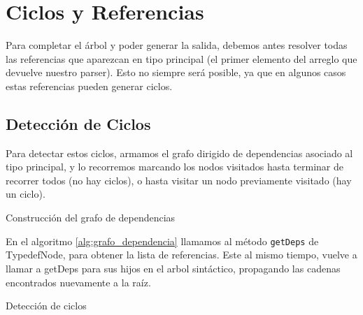 \section{Ciclos y Referencias}
\label{sec:referencias}

Para completar el árbol y poder generar la salida, debemos antes resolver todas
las referencias que aparezcan en tipo principal (el primer elemento del arreglo
que devuelve nuestro parser). Esto no siempre será posible, ya que en algunos
casos estas referencias pueden generar ciclos.

\subsection{Detección de Ciclos}

Para detectar estos ciclos, armamos el grafo dirigido de dependencias asociado al tipo
principal, y lo recorremos marcando los nodos visitados hasta terminar de
recorrer todos (no hay ciclos), o hasta visitar un nodo previamente visitado
(hay un ciclo).

\begin{algorithm}[H]
\begin{algorithmic}
    \EndFor
\EndFunction
\end{algorithmic}
\caption{Construcción del grafo de dependencias}
\label{alg:grafo_dependencia}
\end{algorithm}

En el algoritmo \ref{alg:grafo_dependencia} llamamos al método \texttt{getDeps}
de TypedefNode, para obtener la lista de referencias. Este al mismo tiempo,
vuelve a llamar a getDeps para sus hijos en el arbol sintáctico, propagando las
cadenas encontrados nuevamente a la raíz.

\begin{algorithm}[H]
\begin{algorithmic}
        \EndIf

        \EndIf
    \EndFor
\EndFunction
\end{algorithmic}
\caption{Detección de ciclos}
\label{alg:obtener_ciclo}
\end{algorithm}

